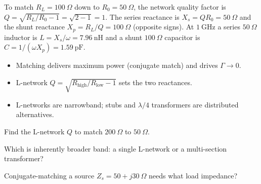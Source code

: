 \begin{workedexample}
To match $R_L = 100\ \Omega$ down to $R_0 = 50\ \Omega$, the network
quality factor is $Q = \sqrt{R_L/R_0 - 1} = \sqrt{2-1} = 1$. The series reactance
is $X_s = Q R_0 = 50\ \Omega$ and the shunt reactance $X_p = R_L/Q = 100\ \Omega$
(opposite signs). At $1\ \text{GHz}$ a series $50\ \Omega$ inductor is
$L = X_s/\omega = 7.96\ \text{nH}$ and a shunt $100\ \Omega$ capacitor is
$C = 1/(\omega X_p) = 1.59\ \text{pF}$.
\end{workedexample}

\begin{keytakeaways}
\begin{itemize}[leftmargin=1.4em,itemsep=2pt]
\item Matching delivers maximum power (conjugate match) and drives $\Gamma \to 0$.
\item L-network $Q = \sqrt{R_{\text{high}}/R_{\text{low}} - 1}$ sets the two reactances.
\item L-networks are narrowband; stubs and $\lambda/4$ transformers are distributed alternatives.
\end{itemize}
\end{keytakeaways}

\begin{exercises}
\item Find the L-network $Q$ to match $200\ \Omega$ to $50\ \Omega$.
\item Which is inherently broader band: a single L-network or a multi-section transformer?
\item Conjugate-matching a source $Z_s = 50 + j30\ \Omega$ needs what load impedance?
\end{exercises}

